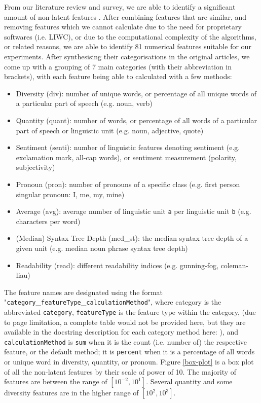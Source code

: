 \documentclass{article}
\begin{document}
 \label{section:non-latent-feat}
From our literature review and survey, we are able to identify a significant amount of non-latent features \cite{zhou2020survey, garg2022linguistic, horne2017}. After combining features that are similar, and removing features which we cannot calculate due to the need for proprietary softwares (i.e. LIWC), or due to the computational complexity of the algorithms, or related reasons, we are able to identify 81 numerical features suitable for our experiments. After synthesising their categorisations in the original articles, we come up with a grouping of 7 main categories (with their abbreviation in brackets), with each feature being able to calculated with a few methods:
\begin{itemize}
  \item Diversity (div): number of unique words, or percentage of all unique words of a particular part of speech (e.g. noun, verb)
  \item Quantity (quant): number of words, or percentage of all words of a particular part of speech or linguistic unit (e.g. noun, adjective, quote)
  \item Sentiment (senti): number of linguistic features denoting sentiment (e.g. exclamation mark, all-cap words), or sentiment measurement (polarity, subjectivity)
  \item Pronoun (pron): number of pronouns of a specific class (e.g. first person singular pronoun: I, me, my, mine)
  \item Average (avg): average number of linguistic unit \texttt{a} per linguistic unit \texttt{b} (e.g. characters per word)
  \item (Median) Syntax Tree Depth (med\_st): the median syntax tree depth of a given unit (e.g. median noun phrase syntax tree depth)
  \item Readability (read): different readability indices (e.g. gunning-fog, coleman-liau)
\end{itemize}

The feature names are designated using the format "\texttt{category}\_\texttt{featureType}\_\texttt{calculationMethod}", where category is the abbreviated \texttt{category}, \texttt{featureType} is the feature type within the category, (due to page limitation, a complete table would not be provided here, but they are available in the docstring description for each category method here: \cite{ducknewsreporters-nonlatent}), and \texttt{calculationMethod} is \texttt{sum} when it is the count (i.e. number of) the respective feature, or the default method; it is \texttt{percent} when it is a percentage of all words or unique word in diversity, quantity, or pronoun. Figure \ref{box-plot} is a box plot of all the non-latent features by their scale of power of 10. The majority of features are between the range of $[10^{-2}, 10^{1}]$. Several quantity and some diversity features are in the higher range of $[10^2, 10^3]$.
\end{document}
